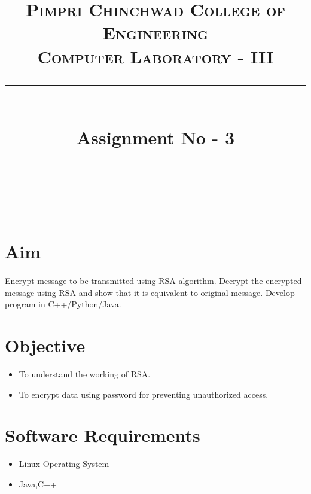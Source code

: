 \documentclass[a4paper,12pt]{article}
\title{
	\normalfont \normalsize 
	\textsc{Pimpri Chinchwad College of Engineering \\ 
		Computer Laboratory - III} \\
	[10pt] 
	\rule{\linewidth}{0.5pt} \\[6pt] 
	\huge Assignment No - 3  \\
	\rule{\linewidth}{2pt}  \\[10pt]
}
\author{}
\date{\normalsize}
\newenvironment{codeblock}{\fontfamily{ccr}\selectfont}{\par}
\begin{document}
\maketitle

\section{Aim}
	\paragraph{} Encrypt message to be transmitted using RSA algorithm. Decrypt the encrypted message using RSA and show that it is equivalent to original message. Develop program in C++/Python/Java. 
	
\section{Objective}
	\begin{itemize}
		\item To understand the working of RSA.
		\item To encrypt data using password for preventing unauthorized access.
	\end{itemize}
	
\section{Software Requirements}
	\begin{itemize}
		\item	Linux Operating System
		\item	Java,C++
	\end{itemize}
	
\end{document}

